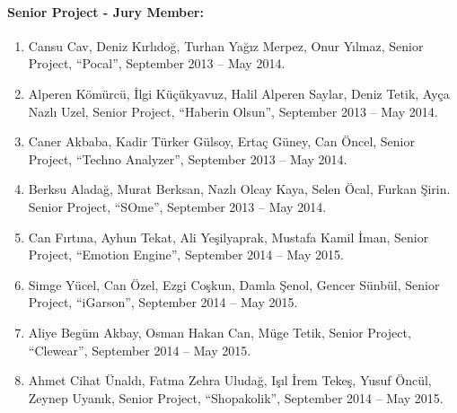 \paragraph{Senior Project - Jury Member:}

\begin{enumerate}
\item Cansu Cav, Deniz Kırlıdoğ, Turhan Yağız Merpez, Onur Yılmaz, Senior Project, ``Pocal'', September 2013 – May 2014.
\item Alperen Kömürcü, İlgi Küçükyavuz, Halil Alperen Saylar, Deniz Tetik, Ayça Nazlı Uzel, Senior Project, ``Haberin Olsun'', September 2013 – May 2014.
\item Caner Akbaba, Kadir Türker Gülsoy, Ertaç Güney, Can Öncel, Senior Project, ``Techno Analyzer'', September 2013 – May 2014.
\item Berksu Aladağ, Murat Berksan, Nazlı Olcay Kaya, Selen Öcal, Furkan Şirin. Senior Project, ``SOme'', September 2013 – May 2014.
\item Can Fırtına, Ayhun Tekat, Ali Yeşilyaprak, Mustafa Kamil İman, Senior Project, ``Emotion Engine'', September 2014 – May 2015.
\item Simge Yücel, Can Özel, Ezgi Coşkun, Damla Şenol, Gencer Sünbül, Senior Project, ``iGarson'', September 2014 – May 2015.
\item Aliye Begüm Akbay, Osman Hakan Can, Müge Tetik, Senior Project, ``Clewear'', September 2014 – May 2015.
\item Ahmet Cihat Ünaldı, Fatma Zehra Uludağ, Işıl İrem Tekeş, Yusuf Öncül, Zeynep Uyanık, Senior Project, ``Shopakolik'', September 2014 – May 2015.
\end{enumerate}
